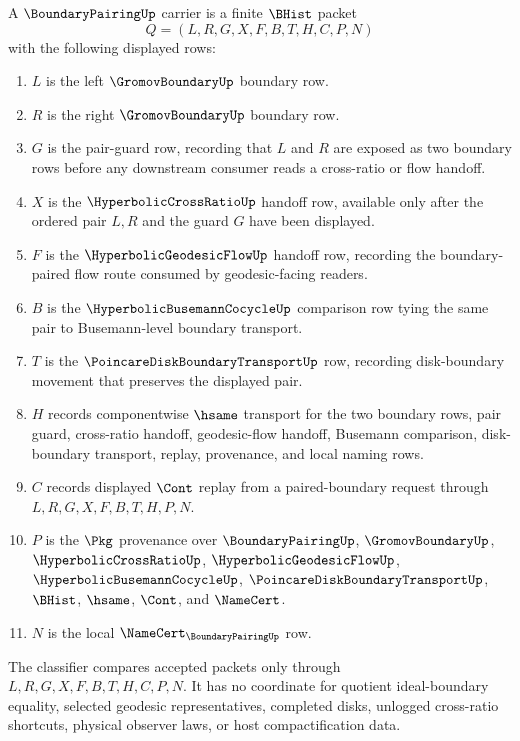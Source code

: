\begin{definition}
\label{def:boundary-pairing-carrier}
A $\BoundaryPairingUp$ carrier is a finite $\BHist$ packet
$$
Q=(L,R,G,X,F,B,T,H,C,P,N)
$$
with the following displayed rows:
\begin{enumerate}
\item $L$ is the left $\GromovBoundaryUp$ boundary row.
\item $R$ is the right $\GromovBoundaryUp$ boundary row.
\item $G$ is the pair-guard row, recording that $L$ and $R$ are exposed as two boundary rows before any downstream consumer reads a cross-ratio or flow handoff.
\item $X$ is the $\HyperbolicCrossRatioUp$ handoff row, available only after the ordered pair $L,R$ and the guard $G$ have been displayed.
\item $F$ is the $\HyperbolicGeodesicFlowUp$ handoff row, recording the boundary-paired flow route consumed by geodesic-facing readers.
\item $B$ is the $\HyperbolicBusemannCocycleUp$ comparison row tying the same pair to Busemann-level boundary transport.
\item $T$ is the $\PoincareDiskBoundaryTransportUp$ row, recording disk-boundary movement that preserves the displayed pair.
\item $H$ records componentwise $\hsame$ transport for the two boundary rows, pair guard, cross-ratio handoff, geodesic-flow handoff, Busemann comparison, disk-boundary transport, replay, provenance, and local naming rows.
\item $C$ records displayed $\Cont$ replay from a paired-boundary request through $L,R,G,X,F,B,T,H,P,N$.
\item $P$ is the $\Pkg$ provenance over $\BoundaryPairingUp$, $\GromovBoundaryUp$, $\HyperbolicCrossRatioUp$, $\HyperbolicGeodesicFlowUp$, $\HyperbolicBusemannCocycleUp$, $\PoincareDiskBoundaryTransportUp$, $\BHist$, $\hsame$, $\Cont$, and $\NameCert$.
\item $N$ is the local $\NameCert_{\BoundaryPairingUp}$ row.
\end{enumerate}
The classifier compares accepted packets only through $L,R,G,X,F,B,T,H,C,P,N$. It has no coordinate for quotient ideal-boundary equality, selected geodesic representatives, completed disks, unlogged cross-ratio shortcuts, physical observer laws, or host compactification data.
\end{definition}

